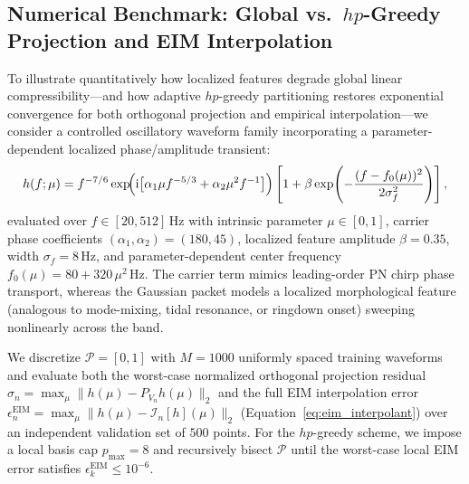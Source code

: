 \documentclass[11pt, a4paper]{article}
\begin{document}
\subsection{Numerical Benchmark: Global vs.\ $hp$-Greedy Projection and EIM Interpolation}

To illustrate quantitatively how localized features degrade global linear compressibility---and how adaptive $hp$-greedy partitioning restores exponential convergence for both orthogonal projection and empirical interpolation---we consider a controlled oscillatory waveform family incorporating a parameter-dependent localized phase/amplitude transient:
\begin{equation}
h(f; \mu) = f^{-7/6} \exp\!\Bigl(\mathrm{i}\bigl[\alpha_1 \mu f^{-5/3} + \alpha_2 \mu^2 f^{-1}\bigr]\Bigr) \left[ 1 + \beta \exp\!\left(-\frac{(f - f_0(\mu))^2}{2\sigma_f^2}\right) \right] ,
\label{eq:benchmark_model}
\end{equation}
evaluated over $f \in [20, 512]\,\mathrm{Hz}$ with intrinsic parameter $\mu \in [0, 1]$, carrier phase coefficients $(\alpha_1, \alpha_2) = (180, 45)$, localized feature amplitude $\beta = 0.35$, width $\sigma_f = 8\,\mathrm{Hz}$, and parameter-dependent center frequency $f_0(\mu) = 80 + 320\,\mu^2\,\mathrm{Hz}$. The carrier term mimics leading-order PN chirp phase transport, whereas the Gaussian packet models a localized morphological feature (analogous to mode-mixing, tidal resonance, or ringdown onset) sweeping nonlinearly across the band.

We discretize $\mathcal{P} = [0, 1]$ with $M = 1000$ uniformly spaced training waveforms and evaluate both the worst-case normalized orthogonal projection residual $\sigma_n = \max_{\mu} \|h(\mu) - P_{V_n} h(\mu)\|_2$ and the full EIM interpolation error $\epsilon_n^{\mathrm{EIM}} = \max_{\mu} \|h(\mu) - \mathcal{I}_n[h](\mu)\|_2$ (Equation~\eqref{eq:eim_interpolant}) over an independent validation set of $500$ points. For the $hp$-greedy scheme, we impose a local basis cap $p_{\max} = 8$ and recursively bisect $\mathcal{P}$ until the worst-case local EIM error satisfies $\epsilon_k^{\mathrm{EIM}} \le 10^{-6}$.
\end{document}

